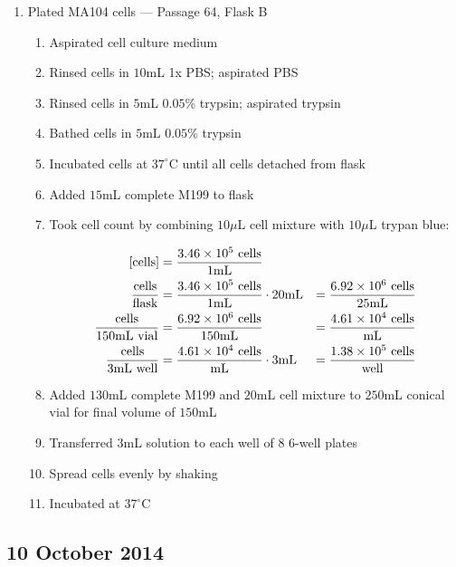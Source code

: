 \begin{enumerate}
	\item Plated MA104 cells --- Passage 64, Flask B
		\begin{enumerate}
			\item Aspirated cell culture medium
			\item Rinsed cells in $10$mL 1x PBS; aspirated PBS
			\item Rinsed cells in $5$mL $0.05$\% trypsin; aspirated trypsin
			\item Bathed cells in $5$mL $0.05$\% trypsin
			\item Incubated cells at $37^{\circ}$C until all cells detached from flask
			\item Added $15$mL complete M199 to flask\
			\item Took cell count by combining $10\mu$L cell mixture with $10\mu$L trypan blue:
			
				\begin{align*}
				\text{[cells]} &= \frac{3.46\times 10^{5}\text{ cells}}{1\text{mL}} \\
				\frac{\text{cells}}{\text{flask}} &= \frac{3.46\times 10^{5}\text{ cells}}{1\text{mL}} \cdot 20\text{mL} &= \frac{6.92\times 10^{6}\text{ cells}}{25\text{mL}}\\
				\frac{\text{cells}}{150\text{mL vial}} &= \frac{6.92\times 10^{6}\text{ cells}}{150\text{mL}} &= \frac{4.61\times 10^{4}\text{ cells}}{\text{mL}}\\
				\frac{\text{cells}}{3\text{mL well}} &= \frac{4.61\times 10^{4}\text{ cells}}{\text{mL}} \cdot 3\text{mL} &= \frac{1.38\times 10^{5}\text{ cells}}{\text{well}}\\
				\end{align*}
			\item Added $130$mL complete M199 and $20$mL cell mixture to $250$mL conical vial for final volume of $150$mL
			\item Transferred $3$mL solution to each well of 8 6-well plates
			\item Spread cells evenly by shaking
			\item Incubated at $37^{\circ}$C
		\end{enumerate}

\end{enumerate}

%

\subsection*{10 October 2014}

